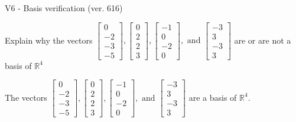 \begin{exercise}
  \begin{exerciseTitle}V6 - Basis verification (ver. 616)\end{exerciseTitle}
  \begin{exerciseStatement}
    Explain why the vectors \(\left[\begin{array}{r}
0 \\
-2 \\
-3 \\
-5
\end{array}\right] , \left[\begin{array}{r}
0 \\
2 \\
2 \\
3
\end{array}\right] , \left[\begin{array}{r}
-1 \\
0 \\
-2 \\
0
\end{array}\right] , \text{ and } \left[\begin{array}{r}
-3 \\
3 \\
-3 \\
3
\end{array}\right]\) are or are not a basis of \(\mathbb{R}^4\)	


  \end{exerciseStatement}
  \begin{exerciseAnswer}
   The vectors \(\left[\begin{array}{r}
0 \\
-2 \\
-3 \\
-5
\end{array}\right] , \left[\begin{array}{r}
0 \\
2 \\
2 \\
3
\end{array}\right] , \left[\begin{array}{r}
-1 \\
0 \\
-2 \\
0
\end{array}\right] , \text{ and } \left[\begin{array}{r}
-3 \\
3 \\
-3 \\
3
\end{array}\right]\) 
  	 are  a basis of \(\mathbb{R}^4\).
  


  \end{exerciseAnswer}
\end{exercise}